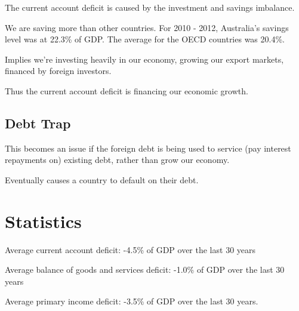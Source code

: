 \documentclass[a4paper,11pt]{article}
\begin{document}
The current account deficit is caused by the investment and savings imbalance.

We are saving more than other countries. For 2010 - 2012, Australia's savings
level was at 22.3\% of GDP. The average for the OECD countries was 20.4\%.

Implies we're investing heavily in our economy, growing our export markets,
financed by foreign investors.

Thus the current account deficit is financing our economic growth.


\subsection{Debt Trap}

This becomes an issue if the foreign debt is being used to service (pay
interest repayments on) existing debt, rather than grow our economy.

Eventually causes a country to default on their debt.




\section{Statistics}

Average current account deficit: -4.5\% of GDP over the last 30 years

Average balance of goods and services deficit: -1.0\% of GDP over the last 30
years

Average primary income deficit: -3.5\% of GDP over the last 30 years.
\end{document}
